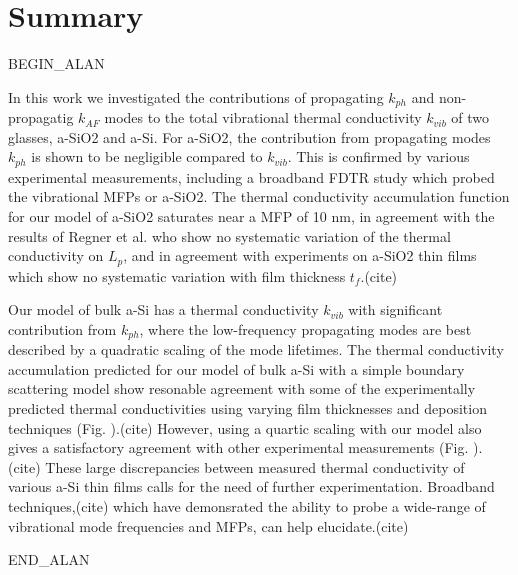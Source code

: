 \documentclass[aps,prb,twocolumn,superscriptaddress,footinbib,amsmath,amssymb,floatfix]{revtex4}
\begin{document}
{{%
\section{\label{S:Lifetimes}Summary}

BEGIN_ALAN

In this work we investigated the contributions of propagating $k_{ph}$ and 
non-propagatig $k_{AF}$ modes to the total vibrational 
thermal conductivity $k_{vib}$ of two glasses, a-SiO2 and a-Si. 
For a-SiO2, the contribution from propagating modes $k_{ph}$ is shown to 
be negligible compared to $k_{vib}$. This is confirmed by various 
experimental measurements, including a broadband FDTR study which 
probed the vibrational MFPs or a-SiO2. The thermal conductivity 
accumulation function for our model of a-SiO2 saturates near a MFP of 
10 nm, in agreement with the results of Regner et al. who show no 
systematic variation of the thermal conductivity on $L_p$,
\cite{regner_broadband_2013} and in agreement with experiments on 
a-SiO2 thin films which show no systematic variation with film 
thickness $t_f$.(cite) 

Our model of bulk a-Si has a thermal conductivity $k_{vib}$ with 
significant contribution from $k_{ph}$, where the low-frequency 
propagating modes are best described by a quadratic scaling of the 
mode lifetimes. 
The thermal conductivity accumulation predicted for our model of bulk 
a-Si with a simple boundary scattering model show resonable agreement 
with some of the experimentally predicted thermal conductivities 
using varying film thicknesses and deposition techniques (Fig. ).(cite) 
However, using a quartic scaling with our model also gives 
a satisfactory agreement with other experimental measurements (Fig. ).(cite) 
These large discrepancies between measured 
thermal conductivity of various a-Si thin films calls for the need of 
further experimentation. Broadband techniques,(cite) which have demonsrated 
the ability to probe a wide-range of vibrational mode 
frequencies and MFPs, can help elucidate.(cite)

END_ALAN

}}
\end{document}
